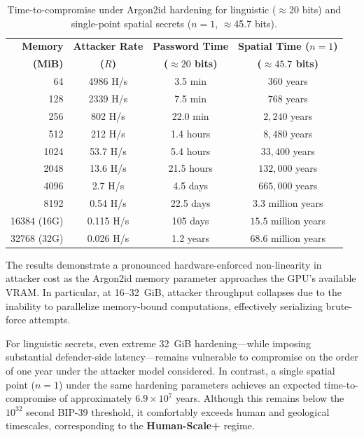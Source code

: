 \documentclass[journal,article,accept,pdftex,moreauthors]{Definitions/mdpi}
\begin{document}
\begin{table}[H]
\caption{Time-to-compromise under Argon2id hardening for linguistic ($\approx$20 bits) and single-point spatial secrets ($n=1$, $\approx$45.7 bits).}
\label{tab:spectrum_comparison}
\centering
\begin{tabular}{rccc}
\toprule
\textbf{Memory} & \textbf{Attacker Rate} & \textbf{Password Time} & \textbf{Spatial Time ($n=1$)} \\
\textbf{(MiB)} & \textbf{($R$)} & \textbf{($\approx 20$ bits)} & \textbf{($\approx 45.7$ bits)} \\
\midrule
64    & 4986 H/s & 3.5 min & $360$ years \\
128   & 2339 H/s & 7.5 min & $768$ years \\
256   & 802 H/s  & 22.0 min & $2{,}240$ years \\
512   & 212 H/s  & 1.4 hours & $8{,}480$ years \\
1024  & 53.7 H/s & 5.4 hours & $33{,}400$ years \\
2048  & 13.6 H/s & 21.5 hours & $132{,}000$ years \\
4096  & 2.7 H/s  & 4.5 days & $665{,}000$ years \\
8192  & 0.54 H/s & 22.5 days & $3.3$ million years \\
\midrule
\rowcolor[gray]{0.9} 16384 (16G) & 0.115 H/s & 105 days & $15.5$ million years \\
\rowcolor[gray]{0.9} 32768 (32G) & 0.026 H/s & 1.2 years & $68.6$ million years \\
\bottomrule
\end{tabular}
\end{table}


The results demonstrate a pronounced hardware-enforced non-linearity in attacker cost as the Argon2id memory parameter approaches the GPU’s available VRAM. In particular, at 16–32~GiB, attacker throughput collapses due to the inability to parallelize memory-bound computations, effectively serializing brute-force attempts.

For linguistic secrets, even extreme 32~GiB hardening—while imposing substantial defender-side latency—remains vulnerable to compromise on the order of one year under the attacker model considered. In contrast, a single spatial point ($n=1$) under the same hardening parameters achieves an expected time-to-compromise of approximately $6.9 \times 10^{7}$ years. Although this remains below the $10^{32}$ second BIP-39 threshold, it comfortably exceeds human and geological timescales, corresponding to the \textbf{Human-Scale+} regime.
\end{document}
